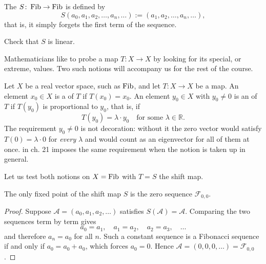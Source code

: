 \begin{definition}
\label{def:shift_map}
The  $S \colon \operatorname{Fib} \to \operatorname{Fib}$ is defined by
\[
S(a_0, a_1, a_2, \dots, a_n, \dots) := (a_1, a_2, \dots, a_n, \dots),
\]
that is, it simply forgets the first term of the sequence.
\end{definition}

\begin{exercise}
\label{exc:shift_is_linear}
Check that $S$ is linear.
\end{exercise}

Mathematicians like to probe a map $T \colon X \to X$ by looking for its special, or
extreme, values. Two such notions will accompany us for the rest of the course.

\begin{definition}
\label{def:fixed_point_eigenvector}
Let $X$ be a real vector space, such as $\operatorname{Fib}$, and let $T \colon X \to X$ be a map.
An element $x_0 \in X$ is a  of $T$ if $T(x_0) = x_0$. An
element $y_0 \in X$ with $y_0 \ne 0$ is an  of $T$ if
$T(y_0)$ is proportional to $y_0$, that is, if
\[
T(y_0) = \lambda \cdot y_0 \quad \text{for some } \lambda \in \mathbb{R}.
\]
The requirement $y_0 \ne 0$ is not decoration: without it the zero vector would
satisfy $T(0) = \lambda \cdot 0$ for \emph{every} $\lambda$ and would count as an
eigenvector for all of them at once.  in ch. 21
imposes the same requirement when the notion is taken up in general.
\end{definition}

Let us test both notions on $X = \operatorname{Fib}$ with $T = S$ the shift map.

\begin{proposition}
\label{prop:fixed_points_shift}
The only fixed point of the shift map $S$ is the zero sequence $\mathcal{F}_{0,0}$.
\end{proposition}

\begin{proof}
Suppose $\mathcal{A} = (a_0, a_1, a_2, \dots)$ satisfies $S(\mathcal{A}) = \mathcal{A}$.
Comparing the two sequences term by term gives
\[
a_0 = a_1, \quad a_1 = a_2, \quad a_2 = a_3, \quad \dots
\]
and therefore $a_n = a_0$ for all $n$. Such a constant sequence is a Fibonacci
sequence if and only if $a_0 = a_0 + a_0$, which forces $a_0 = 0$. Hence
$\mathcal{A} = (0,0,0,\dots) = \mathcal{F}_{0,0}$.
\end{proof}

